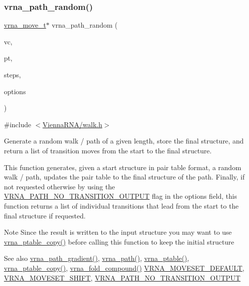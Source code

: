 \subsubsection{\texorpdfstring{vrna\+\_\+path\+\_\+random()}{vrna\_path\_random()}}
{\footnotesize\ttfamily \hyperlink{group__neighbors_structvrna__move__s}{vrna\+\_\+move\+\_\+t}$\ast$ vrna\+\_\+path\+\_\+random (\begin{DoxyParamCaption}\item[{\hyperlink{group__fold__compound_ga1b0cef17fd40466cef5968eaeeff6166}{vrna\+\_\+fold\+\_\+compound\+\_\+t} $\ast$}]{vc,  }\item[{short $\ast$}]{pt,  }\item[{unsigned int}]{steps,  }\item[{unsigned int}]{options }\end{DoxyParamCaption})}



{\ttfamily \#include $<$\hyperlink{walk_8h}{Vienna\+R\+N\+A/walk.\+h}$>$}



Generate a random walk / path of a given length, store the final structure, and return a list of transition moves from the start to the final structure. 

This function generates, given a start structure in pair table format, a random walk / path, updates the pair table to the final structure of the path. Finally, if not requested otherwise by using the \hyperlink{group__paths_ga1ee63e54ecf136491e12ff03ede2622d}{V\+R\+N\+A\+\_\+\+P\+A\+T\+H\+\_\+\+N\+O\+\_\+\+T\+R\+A\+N\+S\+I\+T\+I\+O\+N\+\_\+\+O\+U\+T\+P\+UT} flag in the {\ttfamily options} field, this function returns a list of individual transitions that lead from the start to the final structure if requested.

\begin{DoxyNote}{Note}
Since the result is written to the input structure you may want to use \hyperlink{group__struct__utils_ga2daefbbd6d9f8803731651882f54332d}{vrna\+\_\+ptable\+\_\+copy()} before calling this function to keep the initial structure
\end{DoxyNote}
\begin{DoxySeeAlso}{See also}
\hyperlink{group__paths_gafa18d5153ee540ddd9b93aba59d26184}{vrna\+\_\+path\+\_\+gradient()}, \hyperlink{group__paths_ga327c96463d698e7863508499cacce9ab}{vrna\+\_\+path()}, \hyperlink{group__struct__utils_gae829fb8bb7f694c12a9c0bbc34c77c60}{vrna\+\_\+ptable()}, \hyperlink{group__struct__utils_ga2daefbbd6d9f8803731651882f54332d}{vrna\+\_\+ptable\+\_\+copy()}, \hyperlink{group__fold__compound_ga6601d994ba32b11511b36f68b08403be}{vrna\+\_\+fold\+\_\+compound()} \hyperlink{group__neighbors_gaa5ffec4dd0d02df320f123e6888154d1}{V\+R\+N\+A\+\_\+\+M\+O\+V\+E\+S\+E\+T\+\_\+\+D\+E\+F\+A\+U\+LT}, \hyperlink{group__neighbors_ga68ea27c81de4b74e48b775c04052590b}{V\+R\+N\+A\+\_\+\+M\+O\+V\+E\+S\+E\+T\+\_\+\+S\+H\+I\+FT}, \hyperlink{group__paths_ga1ee63e54ecf136491e12ff03ede2622d}{V\+R\+N\+A\+\_\+\+P\+A\+T\+H\+\_\+\+N\+O\+\_\+\+T\+R\+A\+N\+S\+I\+T\+I\+O\+N\+\_\+\+O\+U\+T\+P\+UT}
\end{DoxySeeAlso}

